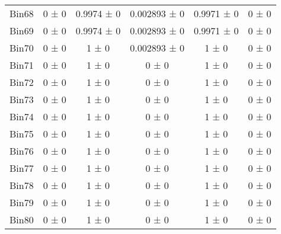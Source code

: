 \begin{tabular}{@{\extracolsep{4pt}}lccccc@{}}
     Bin68 & 0 ± 0 & 0.9974 ± 0 & 0.002893 ± 0 & 0.9971 ± 0 & 0 ± 0 \\ 
     Bin69 & 0 ± 0 & 0.9974 ± 0 & 0.002893 ± 0 & 0.9971 ± 0 & 0 ± 0 \\ 
     Bin70 & 0 ± 0 & 1 ± 0 & 0.002893 ± 0 & 1 ± 0 & 0 ± 0 \\ 
     Bin71 & 0 ± 0 & 1 ± 0 & 0 ± 0 & 1 ± 0 & 0 ± 0 \\ 
     Bin72 & 0 ± 0 & 1 ± 0 & 0 ± 0 & 1 ± 0 & 0 ± 0 \\ 
     Bin73 & 0 ± 0 & 1 ± 0 & 0 ± 0 & 1 ± 0 & 0 ± 0 \\ 
     Bin74 & 0 ± 0 & 1 ± 0 & 0 ± 0 & 1 ± 0 & 0 ± 0 \\ 
     Bin75 & 0 ± 0 & 1 ± 0 & 0 ± 0 & 1 ± 0 & 0 ± 0 \\ 
     Bin76 & 0 ± 0 & 1 ± 0 & 0 ± 0 & 1 ± 0 & 0 ± 0 \\ 
     Bin77 & 0 ± 0 & 1 ± 0 & 0 ± 0 & 1 ± 0 & 0 ± 0 \\ 
     Bin78 & 0 ± 0 & 1 ± 0 & 0 ± 0 & 1 ± 0 & 0 ± 0 \\ 
     Bin79 & 0 ± 0 & 1 ± 0 & 0 ± 0 & 1 ± 0 & 0 ± 0 \\ 
     Bin80 & 0 ± 0 & 1 ± 0 & 0 ± 0 & 1 ± 0 & 0 ± 0 \\ 
\hline\hline
  \end{tabular}
